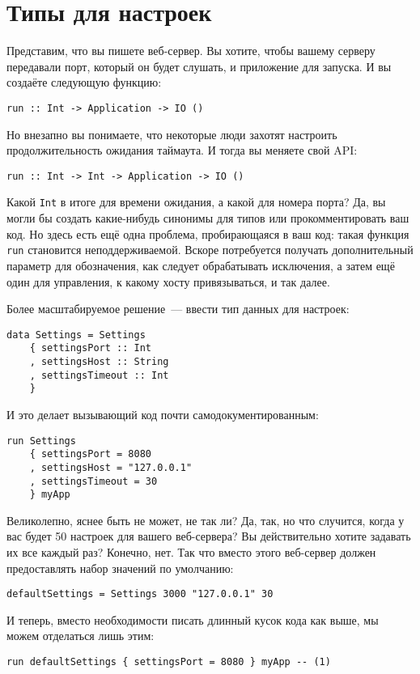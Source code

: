 \chapter{Типы для настроек} \label{chap:settings_types}
Представим, что вы пишете веб-сервер. Вы хотите, чтобы вашему серверу
передавали порт, который он будет слушать, и приложение для запуска. И вы
создаёте следующую функцию:
\begin{lstlisting}
run :: Int -> Application -> IO ()
\end{lstlisting}

Но внезапно вы понимаете, что некоторые люди захотят настроить
продолжительность ожидания таймаута. И тогда вы меняете свой API:
\begin{lstlisting}
run :: Int -> Int -> Application -> IO ()
\end{lstlisting}

Какой \lstinline!Int! в итоге для времени ожидания, а какой для
номера порта? Да, вы могли бы создать какие-нибудь синонимы для типов
или прокомментировать ваш код. Но здесь есть ещё одна проблема,
пробирающаяся в ваш код: такая функция \lstinline!run! становится
неподдерживаемой. Вскоре потребуется получать дополнительный параметр
для обозначения, как следует обрабатывать исключения, а затем ещё один
для управления, к какому хосту привязываться, и так далее.

Более масштабируемое решение~--- ввести тип данных для
настроек:
\begin{lstlisting}
data Settings = Settings
    { settingsPort :: Int
    , settingsHost :: String
    , settingsTimeout :: Int
    }
\end{lstlisting}
И это делает вызывающий код почти самодокументированным:
\begin{lstlisting}
run Settings
    { settingsPort = 8080
    , settingsHost = "127.0.0.1"
    , settingsTimeout = 30
    } myApp
\end{lstlisting}

Великолепно, яснее быть не может, не так ли? Да, так, но что случится, когда у вас
будет 50 настроек для вашего веб-сервера? Вы действительно хотите
задавать их все каждый раз? Конечно, нет. Так что вместо этого
веб-сервер должен предоставлять набор значений по умолчанию:
\begin{lstlisting}
defaultSettings = Settings 3000 "127.0.0.1" 30
\end{lstlisting}
И теперь, вместо необходимости писать длинный кусок кода как выше,
мы можем отделаться лишь этим:
\begin{lstlisting}
run defaultSettings { settingsPort = 8080 } myApp -- (1)
\end{lstlisting}


